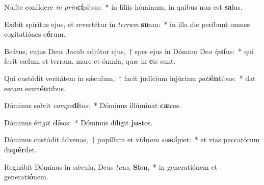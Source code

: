 \item Nolíte confídere \textit{in} \textit{prin}\textbf{cí}pibus:~* in fíliis hóminum, in quibus non est \textbf{sa}lus.
\item Exíbit spíritus ejus, et revertétur in \textit{ter}\textit{ram} \textbf{su}am:~* in illa die períbunt omnes cogitatiónes e\textbf{ó}rum.
\item Beátus, cujus Deus Jacob adjútor ejus,~† spes ejus in Dómino De\textit{o} \textit{ip}\textbf{sí}us:~* qui fecit cælum et terram, mare et ómnia, quæ in \textbf{e}is sunt.
\item Qui custódit veritátem in sǽculum,~† facit judícium injúriam \textit{pa}\textit{ti}\textbf{én}tibus:~* dat escam esuri\textbf{én}tibus.
\item Dóminus solvit \textit{com}\textit{pe}\textbf{dí}tos:~* Dóminus illúminat \textbf{cæ}cos.
\item Dóminus éri\textit{git} \textit{e}\textbf{lí}sos:~* Dóminus díligit \textbf{jus}tos.
\item Dóminus custódit ádvenas,~† pupíllum et vídu\textit{am} \textit{su}\textbf{scí}piet:~* et vias peccatórum dis\textbf{pér}det.
\item Regnábit Dóminus in sǽcula, Deus \textit{tu}\textit{us}, \textbf{Si}on,~* in generatiónem et generati\textbf{ó}nem.
